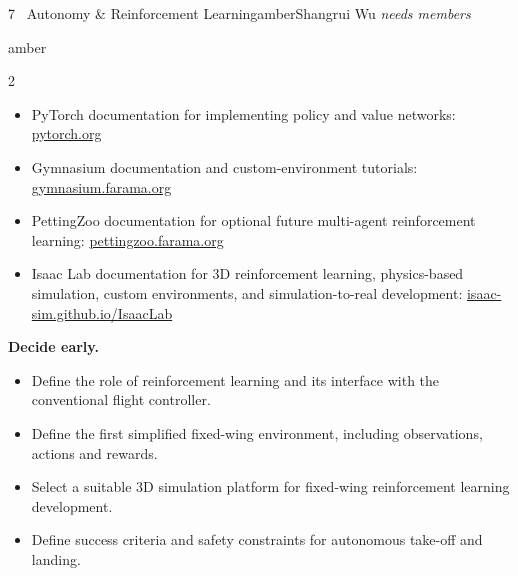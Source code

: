 \documentclass[10pt,a4paper]{article}
\begin{document}
\begin{project}{7 \, Autonomy \& Reinforcement Learning}{amber}{Shangrui Wu \textbullet{} \emph{needs members}}
\begin{research}{amber}
\begin{multicols}{2}
\begin{itemize}
  \item PyTorch documentation for implementing policy and value networks:
  \href{https://pytorch.org/docs/stable/index.html}{pytorch.org}

  \item Gymnasium documentation and custom-environment tutorials:
  \href{https://gymnasium.farama.org}{gymnasium.farama.org}

  
  \item PettingZoo documentation for optional future multi-agent reinforcement
  learning:
  \href{https://pettingzoo.farama.org}{pettingzoo.farama.org}
  
  \item Isaac Lab documentation for 3D reinforcement learning, physics-based
  simulation, custom environments, and simulation-to-real development:
  \href{https://isaac-sim.github.io/IsaacLab/}{isaac-sim.github.io/IsaacLab}


\end{itemize}

\columnbreak

\textbf{Decide early.}

\begin{itemize}

  \item Define the role of reinforcement learning and its interface with the
  conventional flight controller.

  \item Define the first simplified fixed-wing environment, including
  observations, actions and rewards.

  \item Select a suitable 3D simulation platform for fixed-wing reinforcement
  learning development.

  \item Define success criteria and safety constraints for autonomous take-off
  and landing.

\end{itemize}

\end{multicols}
\end{research}
\end{project}






\end{document}
